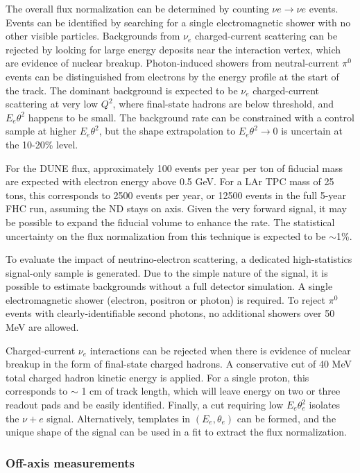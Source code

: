 The overall flux normalization can be determined by counting $\nu e \rightarrow \nu e$ events. Events can be identified by searching for a single electromagnetic shower with no other visible particles. Backgrounds from $\nu_{e}$ charged-current scattering can be rejected by looking for large energy deposits near the interaction vertex, which are evidence of nuclear breakup. Photon-induced showers from neutral-current $\pi^{0}$ events can be distinguished from electrons by the energy profile at the start of the track. The dominant background is expected to be $\nu_{e}$ charged-current scattering at very low $Q^{2}$, where final-state hadrons are below threshold, and $E_{e}\theta^{2}$ happens to be small. The background rate can be constrained with a control sample at higher $E_{e}\theta^{2}$, but the shape extrapolation to $E_{e}\theta^{2} \rightarrow 0$ is uncertain at the 10-20\% level.

For the DUNE flux, approximately 100 events per year per ton of fiducial mass are expected with electron energy above 0.5 GeV. For a LAr TPC mass of 25 tons, this corresponds to 2500 events per year, or 12500 events in the full 5-year FHC run, assuming the ND stays on axis. Given the very forward signal, it may be possible to expand the fiducial volume to enhance the rate. The statistical uncertainty on the flux normalization from this technique is expected to be $\sim$1\%.

To evaluate the impact of neutrino-electron scattering, a dedicated high-statistics signal-only sample is generated. Due to the simple nature of the signal, it is possible to estimate backgrounds without a full detector simulation. A single electromagnetic shower (electron, positron or photon) is required. To reject $\pi^{0}$ events with clearly-identifiable second photons, no additional showers over 50 MeV are allowed.

Charged-current $\nu_{e}$ interactions can be rejected when there is evidence of nuclear breakup in the form of final-state charged hadrons. A conservative cut of 40 MeV total charged hadron kinetic energy is applied. For a single proton, this corresponds to $\sim$ 1 cm of track length, which will leave energy on two or three readout pads and be easily identified. Finally, a cut requiring low $E_{e}\theta_{e}^{2}$ isolates the $\nu+e$ signal. Alternatively, templates in $(E_{e}, \theta_{e})$ can be formed, and the unique shape of the signal can be used in a fit to extract the flux normalization.

\subsubsection{Off-axis  measurements}
\label{sec:ch-nu-osc-06-ndconcept-offaxis}

